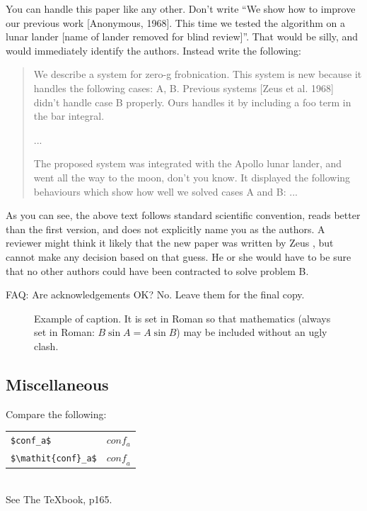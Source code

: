 \documentclass[10pt,twocolumn,letterpaper]{article}
\begin{document}
You can handle this paper like any other.  Don't write ``We show how to
improve our previous work [Anonymous, 1968].  This time we tested the
algorithm on a lunar lander [name of lander removed for blind review]''.
That would be silly, and would immediately identify the authors. Instead
write the following:
\begin{quotation}
\noindent
   We describe a system for zero-g frobnication.  This
   system is new because it handles the following cases:
   A, B.  Previous systems [Zeus et al. 1968] didn't
   handle case B properly.  Ours handles it by including
   a foo term in the bar integral.

   ...

   The proposed system was integrated with the Apollo
   lunar lander, and went all the way to the moon, don't
   you know.  It displayed the following behaviours
   which show how well we solved cases A and B: ...
\end{quotation}
As you can see, the above text follows standard scientific convention,
reads better than the first version, and does not explicitly name you as
the authors.  A reviewer might think it likely that the new paper was
written by Zeus \etal, but cannot make any decision based on that guess.
He or she would have to be sure that no other authors could have been
contracted to solve problem B.

FAQ: Are acknowledgements OK?  No.  Leave them for the final copy.


\begin{figure}[t]
\begin{center}
\fbox{\rule{0pt}{2in} \rule{0.9\linewidth}{0pt}}
\end{center}
   \caption{Example of caption.  It is set in Roman so that mathematics
   (always set in Roman: $B \sin A = A \sin B$) may be included without an
   ugly clash.}
\label{fig:long}
\label{fig:onecol}
\end{figure}

\subsection{Miscellaneous}

\noindent
Compare the following:\\
\begin{tabular}{ll}
 \verb'$conf_a$' &  $conf_a$ \\
 \verb'$\mathit{conf}_a$' & $\mathit{conf}_a$
\end{tabular}\\
See The \TeX book, p165.
\end{document}
